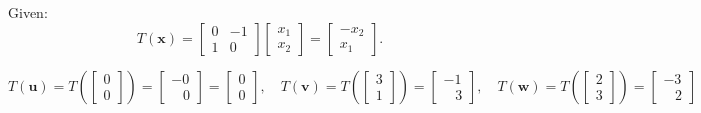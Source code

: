 \documentclass[a4paper,11pt,reqno]{amsart}
\numberwithin{equation}{section}
\begin{document}
\begin{enumerate}
\begin{center}
{{Given:
\[
T(\mathbf{x}) = 
\begin{bmatrix}
    0 & -1\\
    1 & 0 
\end{bmatrix} 
\begin{bmatrix}
    x_1\\
    x_2
\end{bmatrix}
=
\begin{bmatrix}
    -x_2\\
    x_1
\end{bmatrix}.
\]


\[
T(\mathbf{u}) =
T\left(
\begin{bmatrix} 0 \\ 0 \end{bmatrix}
\right) =
\begin{bmatrix} -0 \\ \;\;\;0 \end{bmatrix}
=
\begin{bmatrix} 0 \\ 0 \end{bmatrix},
\quad
T(\mathbf{v})=
T\left(
\begin{bmatrix} 3 \\ 1 \end{bmatrix}
\right) =
\begin{bmatrix} -1 \\ \;\;\;3 \end{bmatrix},
\quad
T(\mathbf{w})=
T\left(
\begin{bmatrix} 2 \\ 3 \end{bmatrix}
\right) =
\begin{bmatrix} -3 \\ \;\;\;2 \end{bmatrix}
\]

}}
\end{center}
\end{enumerate}
\end{document}
